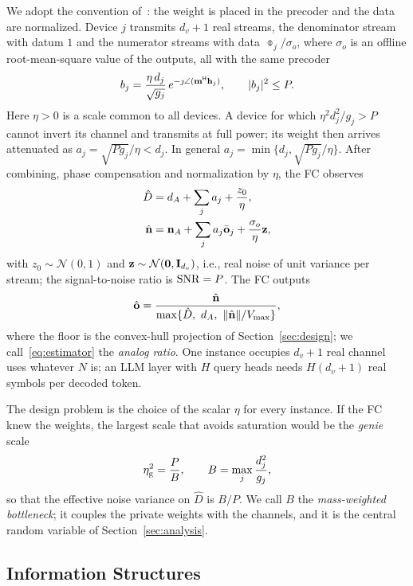 We adopt the convention of~\cite{yang2026airmoe}: the weight is placed in the precoder and the data are normalized. Device $j$ transmits $d_v+1$ real streams, the denominator stream with datum $1$ and the numerator streams with data $\obar_j/\sigma_o$, where $\sigma_o$ is an offline root-mean-square value of the outputs, all with the same precoder
\begin{equation}
b_j=\frac{\eta\,d_j}{\sqrt{g_j}}\,e^{-\jmath\angle(\mathbf{m}^{\mathsf H}\mathbf{h}_j)},\qquad |b_j|^2\le P .
\label{eq:precoder}
\end{equation}
Here $\eta>0$ is a scale common to all devices. A device for which $\eta^2d_j^2/g_j>P$ cannot invert its channel and transmits at full power; its weight then arrives attenuated as $a_j=\sqrt{Pg_j}/\eta<d_j$. In general $a_j=\min\{d_j,\sqrt{Pg_j}/\eta\}$. After combining, phase compensation and normalization by $\eta$, the FC observes
\begin{align}
\hat D&=d_A+\sum_j a_j+\frac{z_0}{\eta}, \label{eq:Dhat}\\
\hat{\mathbf{n}}&=\mathbf{n}_A+\sum_j a_j\bar{\mathbf{o}}_j+\frac{\sigma_o}{\eta}\mathbf{z}, \label{eq:Nhat}
\end{align}
with $z_0\sim\mathcal{N}(0,1)$ and $\mathbf{z}\sim\mathcal{N}(\mathbf{0},\mathbf{I}_{d_v})$, i.e., real noise of unit variance per stream; the signal-to-noise ratio is $\mathrm{SNR}=P$. The FC outputs
\begin{equation}
\hat\vo=\frac{\hat\vn}{\max\{\hat D,\ d_A,\ \|\hat\vn\|/V_{\max}\}},
\label{eq:estimator}
\end{equation}
where the floor is the convex-hull projection of Section~\ref{sec:design}; we call~\eqref{eq:estimator} the \emph{analog ratio}. One instance occupies $d_v+1$ real channel uses whatever $N$ is; an LLM layer with $H$ query heads needs $H(d_v+1)$ real symbols per decoded token.

The design problem is the choice of the scalar $\eta$ for every instance. If the FC knew the weights, the largest scale that avoids saturation would be the \emph{genie} scale
\begin{equation}
\eta_{\rm g}^2=\frac{P}{B},\qquad B=\max_j\frac{d_j^2}{g_j},
\label{eq:genie}
\end{equation}
so that the effective noise variance on $\hat D$ is $B/P$. We call $B$ the \emph{mass-weighted bottleneck}; it couples the private weights with the channels, and it is the central random variable of Section~\ref{sec:analysis}.

\subsection{Information Structures}

